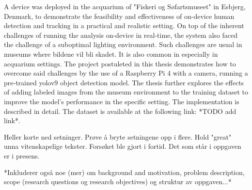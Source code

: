 A device was deployed in the acquarium of "Fiskeri og Søfartsmuseet" in Esbjerg, Denmark, to demonstrate the feasibility and effectiveness of on-device human detection and tracking in a practical and realistic setting. On top of the inherent challenges of running the analysis on-device in real-time, the system also faced the challenge of a suboptimal lighting environment. Such challenges are usual in museums where bildene vil bli skadet. It is also common in especially in acquarium settings. The project postuleted in this thesis demonstrates how to overcome said challenges by the use of a Raspberry Pi 4 with a camera, running a pre-trained yolov9 object detection model. The thesis further explores the effects of adding labeled images from the museum environment to the training dataset to improve the model's performance in the specific setting. The implementation is described in detail. The dataset is available at the following link: *TODO add link*. 

Heller korte ned setninger. Prøve å bryte setningene opp i flere. Hold "great" unna vitenskapelige tekster. Forsøket ble gjort i fortid. Det som står i oppgaven er i presens.

*Inkluderer også noe (mer) om background and motivation, problem description, scope (research questions og research objectives) og struktur av oppgaven...*